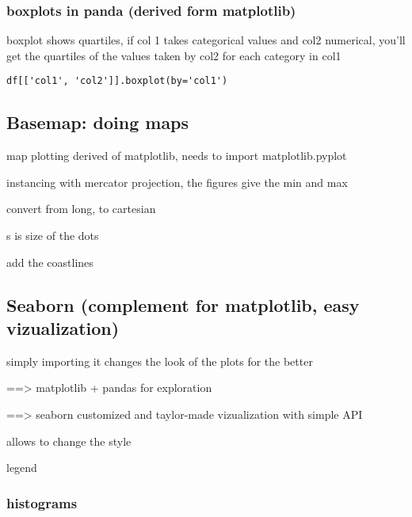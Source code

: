 		\subsubsection{boxplots in panda (derived form matplotlib)}

			boxplot shows quartiles, if col 1 takes categorical values and col2 numerical, you'll get the quartiles of the values taken by col2 for each category in col1 

\begin{lstlisting}
df[['col1', 'col2']].boxplot(by='col1')
\end{lstlisting}


	\subsection{Basemap: doing maps}
	
		map plotting derived of matplotlib, needs to import matplotlib.pyplot


		 instancing with mercator projection, the figures give the min and max

		 convert from long, to cartesian

		 s is size of the dots

		 add the coastlines

	\subsection{Seaborn (complement for matplotlib, easy vizualization)}

		simply importing it changes the look of the plots for the better

		==> matplotlib + pandas for exploration

		==> seaborn customized and taylor-made vizualization with simple API


		 allows to change the style

		 legend

		\subsubsection{histograms}

